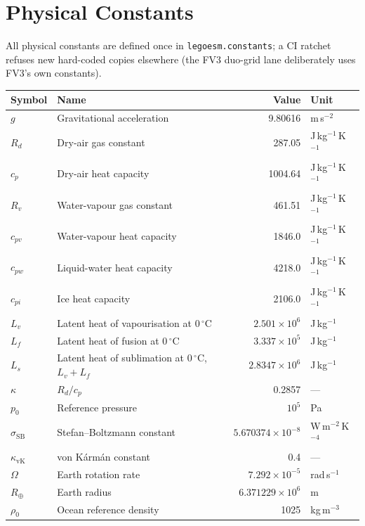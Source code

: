 \documentclass[11pt,a4paper]{article}
\newcommand{\Rd}{R_d}
\newcommand{\cpd}{c_p}
\newcommand{\Lv}{L_v}
\newcommand{\Rv}{R_v}
\newcommand{\pref}{p_0}
\newcommand{\SB}{\sigma_{\mathrm{SB}}}
\begin{document}
\section{Physical Constants}
\label{sec:constants}

All physical constants are defined once in \texttt{legoesm.constants}; a CI ratchet refuses new hard-coded copies elsewhere (the FV3 duo-grid lane deliberately uses FV3's own constants).

\begin{center}
\begin{tabular}{llrl}
\toprule
Symbol & Name & Value & Unit \\
\midrule
$g$ & Gravitational acceleration & 9.80616 & m\,s$^{-2}$ \\
$\Rd$ & Dry-air gas constant & 287.05 & J\,kg$^{-1}$\,K$^{-1}$ \\
$\cpd$ & Dry-air heat capacity & 1004.64 & J\,kg$^{-1}$\,K$^{-1}$ \\
$\Rv$ & Water-vapour gas constant & 461.51 & J\,kg$^{-1}$\,K$^{-1}$ \\
$c_{pv}$ & Water-vapour heat capacity & 1846.0 & J\,kg$^{-1}$\,K$^{-1}$ \\
$c_{pw}$ & Liquid-water heat capacity & 4218.0 & J\,kg$^{-1}$\,K$^{-1}$ \\
$c_{pi}$ & Ice heat capacity & 2106.0 & J\,kg$^{-1}$\,K$^{-1}$ \\
$\Lv$ & Latent heat of vapourisation at 0\,$^\circ$C & $2.501\times10^6$ & J\,kg$^{-1}$ \\
$L_f$ & Latent heat of fusion at 0\,$^\circ$C & $3.337\times10^5$ & J\,kg$^{-1}$ \\
$L_s$ & Latent heat of sublimation at 0\,$^\circ$C, $\Lv+L_f$ & $2.8347\times10^6$ & J\,kg$^{-1}$ \\
$\kappa$ & $\Rd/\cpd$ & 0.2857 & --- \\
$\pref$ & Reference pressure & $10^5$ & Pa \\
$\SB$ & Stefan--Boltzmann constant & $5.670374\times10^{-8}$ & W\,m$^{-2}$\,K$^{-4}$ \\
$\kappa_{\mathrm{vK}}$ & von K\'arm\'an constant & 0.4 & --- \\
$\Omega$ & Earth rotation rate & $7.292\times10^{-5}$ & rad\,s$^{-1}$ \\
$R_{\oplus}$ & Earth radius & $6.371229\times10^6$ & m \\
$\rho_0$ & Ocean reference density & 1025 & kg\,m$^{-3}$ \\
\bottomrule
\end{tabular}
\end{center}
\end{document}
